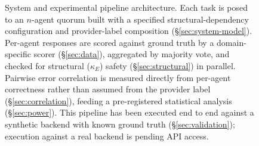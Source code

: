 \begin{figure}[t]
\caption{System and experimental pipeline architecture. Each task is posed to an $n$-agent quorum built with a specified structural-dependency configuration and provider-label composition (\S\ref{sec:system-model}). Per-agent responses are scored against ground truth by a domain-specific scorer (\S\ref{sec:data}), aggregated by majority vote, and checked for structural ($\kappa_E$) safety (\S\ref{sec:structural}) in parallel. Pairwise error correlation is measured directly from per-agent correctness rather than assumed from the provider label (\S\ref{sec:correlation}), feeding a pre-registered statistical analysis (\S\ref{sec:power}). This pipeline has been executed end to end against a synthetic backend with known ground truth (\S\ref{sec:validation}); execution against a real backend is pending API access.}
\label{fig:flowchart}
\end{figure}
